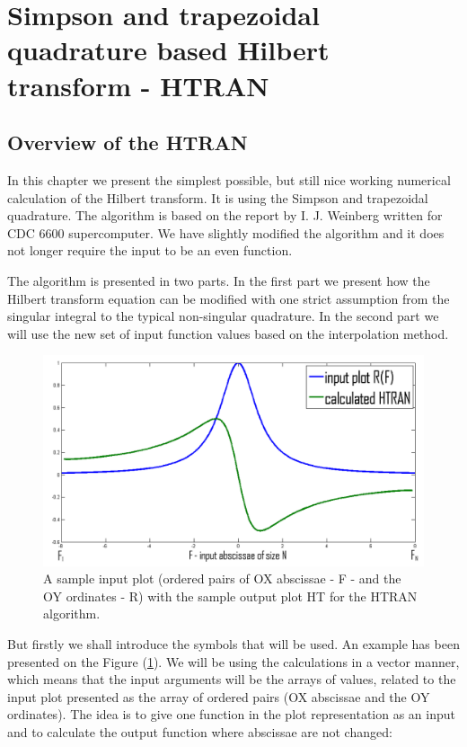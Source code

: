 \documentclass[12pt,twoside,a4paper]{article}
\numberwithin{equation}{subsection}
\numberwithin{figure}{subsection}
\begin{document}
\section{Simpson and trapezoidal quadrature based Hilbert transform - HTRAN} \label{chap:htran}

\subsection{Overview of the HTRAN} \label{chap:htran_overview}

In this chapter we present the simplest possible, but still nice working numerical calculation of the Hilbert transform. It is using the
Simpson and trapezoidal quadrature. The algorithm is based on the report by I. J. Weinberg \cite{weinberg_hilbert} written for CDC 6600
supercomputer. We have slightly modified the algorithm and it does not longer require the input to be an even function. 

The algorithm is presented in two parts. In the first part we present how the Hilbert transform equation can be modified with one strict
assumption from the singular integral to the typical non-singular quadrature. In the second part we will use the new set of input function
values based on the interpolation method.

\begin{figure}
	\includegraphics[width=150mm]{img/htran_illustration.png}
	\caption{A sample input plot (ordered pairs of OX abscissae - F - and the OY ordinates - R) with the sample output plot HT for the HTRAN
	algorithm. \label{fig:htran_illustration}} 
\end{figure}

But firstly we shall introduce the symbols that will be used. An example has been presented on the Figure (\ref{fig:htran_illustration}).
We will be using the calculations in a vector manner, which means that the input arguments will be the arrays of values, related to the
input plot presented as the array of ordered pairs (OX abscissae and the OY ordinates). The idea is to give one function in the plot
representation as an input and to calculate the output function where abscissae are not changed:
\end{document}
